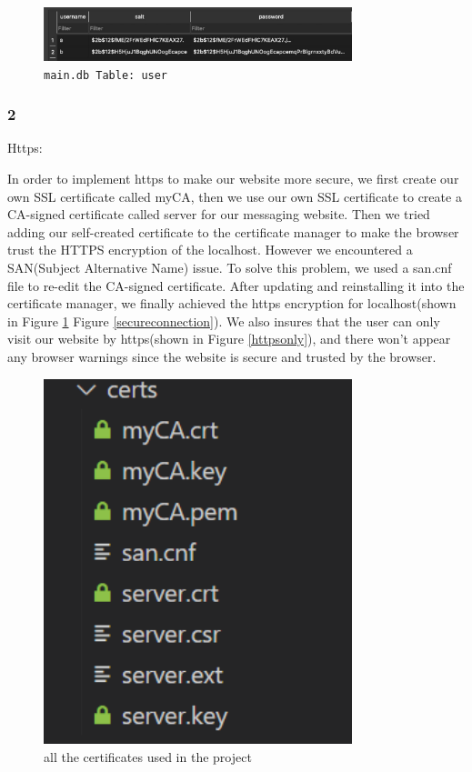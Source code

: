\documentclass[12pt]{article}
\begin{document}
        \begin{figure}[H]
            \centering
            \includegraphics[width=0.8\textwidth]{graphs/hashed_passwd.jpg}
            \caption{\texttt{main.db Table: user}}
        \end{figure}

	\subsubsection*{2}Https:

        In order to implement https to make our website more secure, we first create our own SSL certificate called myCA, then we use our own SSL certificate to create a CA-signed certificate called server for our messaging website. Then we tried adding our self-created certificate to the certificate manager to make the browser trust the HTTPS encryption of the localhost. However we encountered a SAN(Subject Alternative Name) issue. To solve this problem, we used a san.cnf file to re-edit the CA-signed certificate. After updating and reinstalling it into the certificate manager, we finally achieved the https encryption for localhost(shown in Figure \ref{certificates} Figure \ref{secureconnection}). We also insures that the user can only visit our website by https(shown in Figure \ref{httpsonly}), and there won't appear any browser warnings since the website is secure and trusted by the browser.

    	\begin{figure}[H]
            \centering
            \includegraphics[width=0.8\textwidth]{zzrgraphs/certificates.png}
            \caption{all the certificates used in the project}
    		\label{certificates}
        \end{figure}
\end{document}
